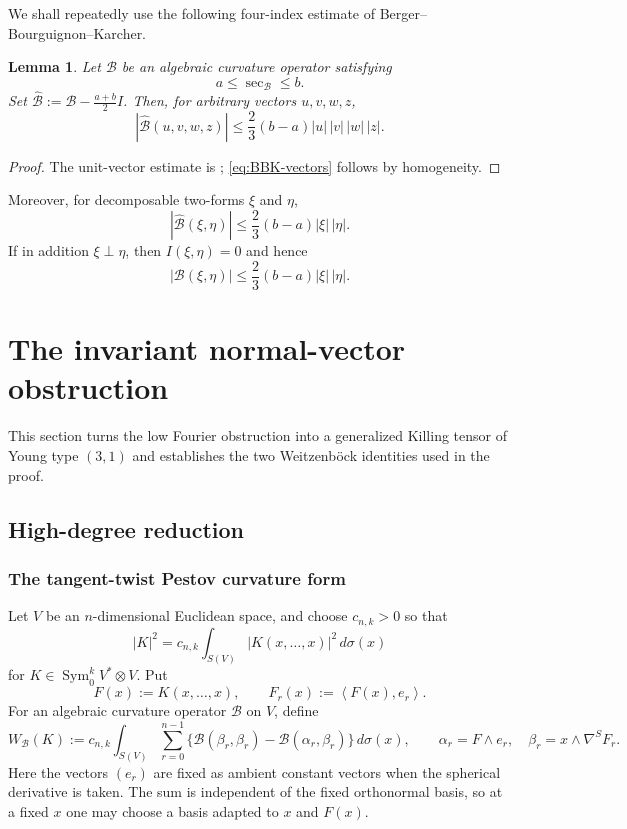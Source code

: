 \documentclass[reqno,11pt]{amsart}
\newtheorem{lemma}[theorem]{Lemma}
\theoremstyle{definition}
\newcommand{\cB}{\mathcal B}
\newcommand{\Sym}{\operatorname{Sym}}
\newcommand{\inner}[2]{\left\langle #1,#2\right\rangle}
\begin{document}
We shall repeatedly use the following four-index estimate of Berger–Bourguignon–Karcher.
\begin{lemma}\label{lem:BBK}
Let $\cB$ be an algebraic curvature operator satisfying
$$
  a\leq\sec_{\cB}\leq b.
$$
Set $\widehat{\cB}:=\cB-\frac{a+b}{2}I$.  Then, for arbitrary vectors
$u,v,w,z$,
\begin{equation}\label{eq:BBK-vectors}
  |\widehat{\cB}(u,v,w,z)|
  \leq\frac23(b-a)|u|\,|v|\,|w|\,|z|.
\end{equation}
\end{lemma}


\begin{proof}
The unit-vector estimate is \cite[Lemma~3.7]{BourguignonKarcher78};
\eqref{eq:BBK-vectors} follows by homogeneity.  
\end{proof}
Moreover, for decomposable two-forms $\xi$ and $\eta$,
$$
  |\widehat{\cB}(\xi,\eta)|
  \leq\frac23(b-a)|\xi|\,|\eta|.
$$
If in addition $\xi\perp\eta$, then $I(\xi,\eta)=0$ and hence
\begin{equation}\label{eq:BK-simple-form}
  |\cB(\xi,\eta)|
  \leq\frac23(b-a)|\xi|\,|\eta|.
\end{equation}

\section{The invariant normal-vector obstruction}\label{sec:normal-vector}

This section turns the low Fourier obstruction into a generalized Killing
tensor of Young type $(3,1)$ and establishes the two Weitzenb\"ock identities
used in the proof.

\subsection{High-degree reduction}\label{sec:reduction}

\subsubsection{The tangent-twist Pestov curvature form}

Let $V$ be an $n$-dimensional Euclidean space, and choose $c_{n,k}>0$ so that
$$
  |K|^2
  =c_{n,k}\int_{S(V)}|K(x,\ldots,x)|^2\,d\sigma(x)
$$
for $K\in\Sym^k_0V^*\otimes V$. Put
$$
  F(x):=K(x,\ldots,x),
  \qquad
  F_r(x):=\inner{F(x)}{e_r}.
$$
For an algebraic curvature operator $\cB$ on $V$, define
\begin{equation}\label{eq:tangent-twist-form}
  W_{\cB}(K)
  :=c_{n,k}\int_{S(V)}\sum_{r=0}^{n-1}
  \bigl\{\cB(\beta_r,\beta_r)-\cB(\alpha_r,\beta_r)\bigr\}\,d\sigma(x),
  \qquad
  \alpha_r=F\wedge e_r,
  \quad
  \beta_r=x\wedge\nabla^S F_r.
\end{equation}
Here the vectors $(e_r)$ are fixed as ambient constant vectors when the
spherical derivative is taken. The sum is independent of the fixed
orthonormal basis, so at a fixed $x$ one may choose a basis adapted to $x$
and $F(x)$.
\end{document}
